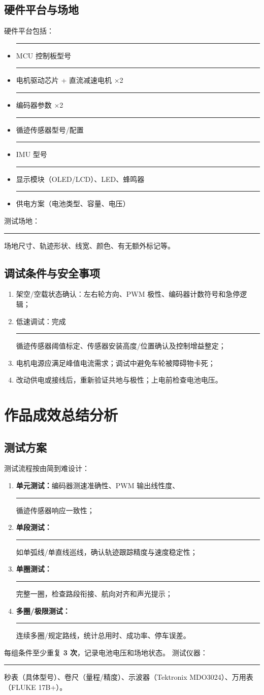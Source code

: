 \documentclass[12pt,a4paper,fontset=fandol]{ctexart}
\newcommand{\blank}{\rule{4cm}{0.4pt}}   %
\begin{document}
\subsection{硬件平台与场地}
硬件平台包括：
\begin{itemize}
  \item \blank{MCU 控制板型号}
  \item \blank{电机驱动芯片 + 直流减速电机 ×2}
  \item \blank{编码器参数} ×2
  \item \blank{循迹传感器型号/配置}
  \item \blank{IMU 型号}
  \item \blank{显示模块（OLED/LCD）、LED、蜂鸣器}
  \item \blank{供电方案（电池类型、容量、电压）}
\end{itemize}
测试场地：\blank{场地尺寸、轨迹形状、线宽、颜色、有无额外标记等}。

\subsection{调试条件与安全事项}
\begin{enumerate}
  \item 架空/空载状态确认：左右轮方向、PWM 极性、编码器计数符号和急停逻辑；
  \item 低速调试：完成\blank{循迹传感器}阈值标定、传感器安装高度/位置确认及控制增益整定；
  \item 电机电源应满足峰值电流需求；调试中避免车轮被障碍物卡死；
  \item 改动供电或接线后，重新验证共地与极性；上电前检查电池电压。
\end{enumerate}

\section{作品成效总结分析}

\subsection{测试方案}
测试流程按由简到难设计：
\begin{enumerate}
  \item \textbf{单元测试：}编码器测速准确性、PWM 输出线性度、\blank{循迹传感器}响应一致性；
  \item \textbf{单段测试：}\blank{如单弧线/单直线巡线，确认轨迹跟踪精度与速度稳定性}；
  \item \textbf{单圈测试：}\blank{完整一圈，检查路段衔接、航向对齐和声光提示}；
  \item \textbf{多圈/极限测试：}\blank{连续多圈/规定路线，统计总用时、成功率、停车误差}。
\end{enumerate}
每组条件至少重复 \textbf{3 次}，记录电池电压和场地状态。
测试仪器：\blank{秒表（具体型号）、卷尺（量程/精度）、示波器（Tektronix MDO3024）、万用表（FLUKE 17B+）}。
\end{document}
